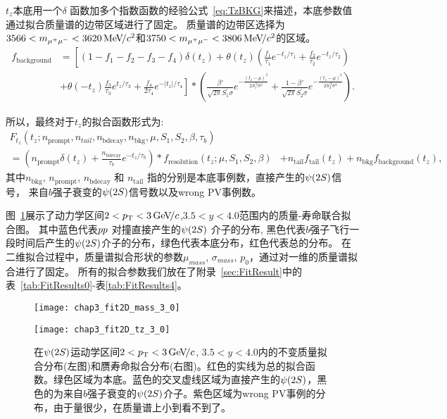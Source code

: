 $t_{z}$本底用一个$\delta$ 函数加多个指数函数的经验公式~\ref{eq:TzBKG}来描述，本底参数值通过拟合质量谱的边带区域进行了固定。
质量谱的边带区选择为$3566<m_{{\mu^+\mu^-}}<3620{\mathrm{\,Me\kern -0.1em V\!/}c^2}$和$3750<m_{{\mu^+\mu^-}}<3806{\mathrm{\,Me\kern -0.1em V\!/}c^2}$的区域。
\begin{align}
f_\mathrm{background} &=
\left[(1-f_1-f_2-f_3-f_4)\delta(t_z)+\theta(t_z)(\frac{f_1}{\tau_1}e^{-t_z/\tau_1}+\frac{f_2}{\tau_2}e^{-t_z/\tau_2})\right.
\nonumber\\
&\left. +\theta(-t_z)\frac{f_3}{\tau_3}e^{t_z/\tau_3}+\frac{f_4}{2\tau_4}e^{-|t_z|/\tau_4}
\right]\ast \left(\frac{\beta'}{\sqrt{2\pi}S^{'}_1\sigma} e^{-\frac{(t_z-\mu)^2}{2S^{'2}_1\sigma^2}}
  +\frac{1-\beta'}{\sqrt{2\pi}S^{'}_2\sigma} e^{-\frac{(t_z-\mu)^2}{2S^{'2}_2\sigma^2}}\right). 
\label{eq:TzBKG}
\end{align}

所以，最终对于$t_z$的拟合函数形式为:
\begin{align}
F_{t_z}(t_z;n_{\mathrm{prompt}},n_{tail},n_{\mathrm{bdecay}},n_\mathrm{bkg},\mu,S_1,S_2,\beta,\tau_b)&   \nonumber \\
      =\left(n_{\mathrm{prompt}}\delta(t_z)+\frac{n_{\mathrm{bdecay}}}{\tau_b}e^{-t_z/\tau_b}\right)\ast f_\mathrm{resolution}(t_z;\mu,S_1,S_2,\beta)
      &+n_{\mathrm{tail}} f_\mathrm{tail}(t_z)+n_\mathrm{bkg}f_\mathrm{background}(t_z), \label{eq:FinalTz}
\end{align}
其中$n_\mathrm{bkg}$, $n_{\mathrm{prompt}}$, $n_{\mathrm{bdecay}}$ 和 $n_{\mathrm{tail}}$ 指的分别是本底事例数，直接产生的${\psi{(2S)}}$信号， 来自$b$强子衰变的${\psi{(2S)}}$信号数以及wrong PV事例数。

图~\ref{fig:tzmass}展示了动力学区间$2<\mbox{$p_{\mathrm{ T}}$}<3{\mathrm{\,Ge\kern -0.1em V\!/}c}$,$3.5<y<4.0$范围内的质量-寿命联合拟合图。
其中蓝色代表${pp}$ 对撞直接产生的${\psi{(2S)}}$ 介子的分布, 黑色代表$b$强子飞行一段时间后产生的${\psi{(2S)}}$介子的分布，绿色代表本底分布，红色代表总的分布。
在二维拟合过程中，质量谱拟合形状的参数$\mu_{mass}$, $\sigma_{mass}$, $p_{0}$，通过对一维的质量谱拟合进行了固定。
所有的拟合参数我们放在了附录~\ref{sec:FitResult}中的表~\ref{tab:FitResults0}-表\ref{tab:FitResults4}。

\begin{figure}[!tbp]
\centering
\begin{minipage}[t]{0.49\textwidth}
\centering
\texttt{[image: chap3\_fit2D\_mass\_3\_0]}
\end{minipage}
\begin{minipage}[t]{0.49\textwidth}
\centering
\texttt{[image: chap3\_fit2D\_tz\_3\_0]}
\end{minipage}
\caption{在${\psi{(2S)}}$运动学区间$2<\mbox{$p_{\mathrm{ T}}$}<3{\mathrm{\,Ge\kern -0.1em V\!/}c}$, $3.5<y<4.0$内的不变质量拟合分布(左图)和赝寿命拟合分布(右图)。红色的实线为总的拟合函数。绿色区域为本底。蓝色的交叉虚线区域为直接产生的${\psi{(2S)}}$，黑色的为来自$b$强子衰变的${\psi{(2S)}}$介子。紫色区域为wrong PV事例的分布，由于量很少，在质量谱上小到看不到了。}
\label{fig:tzmass}
\end{figure}


